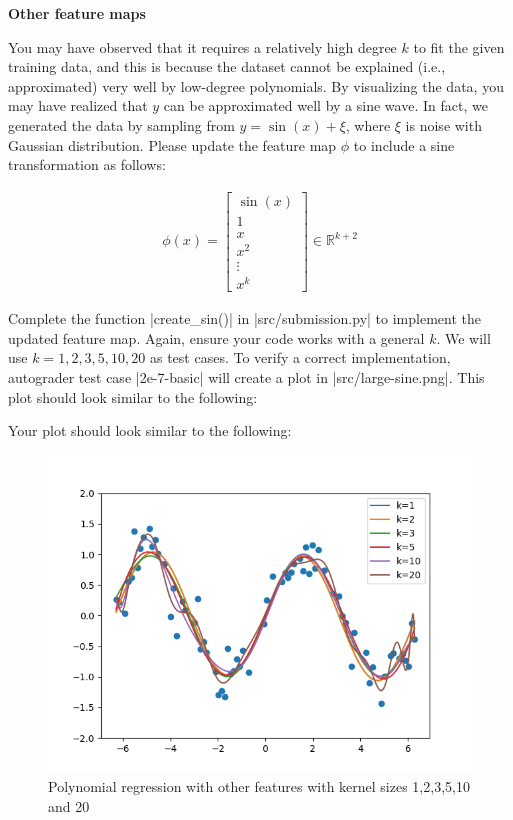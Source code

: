 \item {} {\bf Other feature maps}

You may have observed that it requires a relatively high degree $k$ to fit the given training data, and this is because the dataset cannot be explained (i.e., approximated) very well by low-degree polynomials. By visualizing the data, you may have realized that $y$ can be approximated well by a sine wave. In fact, we generated the data by sampling from $y = \sin(x) + \xi$, where $\xi$ is noise with Gaussian distribution. Please update the feature map $\phi$ to include a sine transformation as follows:

\begin{align}
\phi(x) = \left[\begin{array}{c} \sin(x) \\ 1 \\ x \\ x^2\\ \vdots \\x^k\end{array}\right]\in \mathbb{R}^{k+2} \label{eqn:feature-sine}
\end{align}

Complete the function |create_sin()| in |src/submission.py| to implement the updated feature map.  Again, ensure your code  works with a general $k$.  We will use $k=1,2,3,5,10,20$ as test cases. To verify a correct implementation, autograder test case |2e-7-basic| will create a plot in |src/large-sine.png|.  This plot should look similar to the following:

Your plot should look similar to the following:
\begin{figure}[H]
  \centering
  \includegraphics[width=0.65\linewidth]{02-featuremaps/large-sine.png}
  \centering
\caption{Polynomial regression with other features with kernel sizes 1,2,3,5,10 and 20}
\end{figure}
